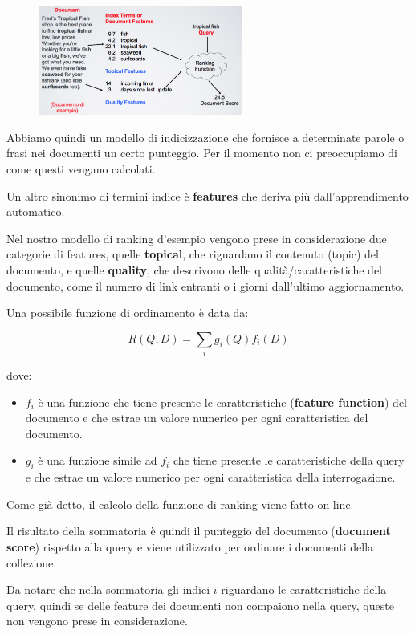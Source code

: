 \begin{figure}[htbp]
	\centering
	\includegraphics[width=0.6\textwidth]{./images/l6-modello}
\end{figure}


\noindent Abbiamo quindi un modello di indicizzazione che fornisce a determinate parole o frasi nei documenti un certo punteggio. Per il momento non ci preoccupiamo di come questi vengano calcolati.

Un altro sinonimo di termini indice è \textbf{features} che deriva più dall'apprendimento automatico.

Nel nostro modello di ranking d'esempio vengono prese in considerazione due categorie di features, quelle \textbf{topical}, che riguardano il contenuto (topic) del documento, e quelle \textbf{quality}, che descrivono delle qualità/caratteristiche del documento, come il numero di link entranti o i giorni dall'ultimo aggiornamento.

Una possibile funzione di ordinamento è data da:

$$
R(Q,D) = \sum_i g_i(Q) f_i(D)
$$

\noindent dove:
\begin{itemize}
	\item $f_i$ è una funzione che tiene presente le caratteristiche (\textbf{feature function}) del documento e che estrae un valore numerico per ogni caratteristica del documento.
	\item $g_i$ è una funzione simile ad $f_i$ che tiene presente le caratteristiche della query e che estrae un valore numerico per ogni caratteristica della interrogazione.
\end{itemize}

\noindent Come già detto, il calcolo della funzione di ranking viene fatto on-line.

Il risultato della sommatoria è quindi il punteggio del documento (\textbf{document score}) rispetto alla query e viene utilizzato per ordinare i documenti della collezione.

Da notare che nella sommatoria gli indici $i$ riguardano le caratteristiche della query, quindi se delle feature dei documenti non compaiono nella query, queste non vengono prese in considerazione.

